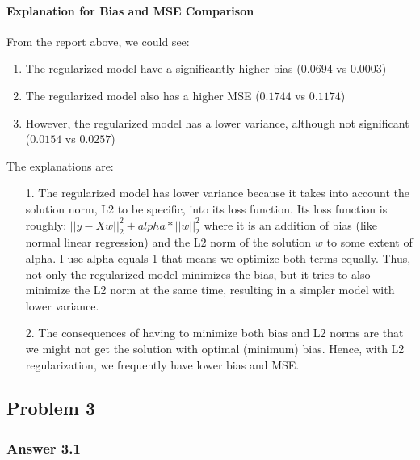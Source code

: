 \documentclass[11pt]{article}
\providecommand{\tightlist}{%
      \setlength{\itemsep}{0pt}\setlength{\parskip}{0pt}}
\begin{document}
    \hypertarget{explanation-for-bias-and-mse-comparison}{%
\paragraph{Explanation for Bias and MSE
Comparison}\label{explanation-for-bias-and-mse-comparison}}
$$$$
From the report above, we could see:

\begin{enumerate}
\def\labelenumi{\arabic{enumi}.}
\tightlist
\item
  The regularized model have a significantly higher bias (\(0.0694\) vs
  \(0.0003\))
\item
  The regularized model also has a higher MSE (\(0.1744\) vs \(0.1174\))
\item
  However, the regularized model has a lower variance, although not
  significant (\(0.0154\) vs \(0.0257\))
\end{enumerate}

The explanations are: 
\begin{itemize}
    \item [1.] The regularized model has lower variance
because it takes into account the solution norm, L2 to be specific, into
its loss function. Its loss function is roughly:
\(||y - Xw||^2_2 + alpha * ||w||^2_2\) where it is an addition of bias
(like normal linear regression) and the L2 norm of the solution \(w\) to
some extent of alpha. I use alpha equals 1 that means we optimize both
terms equally. Thus, not only the regularized model minimizes the bias,
but it tries to also minimize the L2 norm at the same time, resulting in
a simpler model with lower variance.
    \item [2.] The consequences of having to
minimize both bias and L2 norms are that we might not get the solution
with optimal (minimum) bias. Hence, with L2 regularization, we
frequently have lower bias and MSE.
\end{itemize}

    \hypertarget{problem-3}{%
\subsection{Problem 3}\label{problem-3}}

    \hypertarget{answer-3.1}{%
\subsubsection{Answer 3.1}\label{answer-3.1}}
\end{document}
